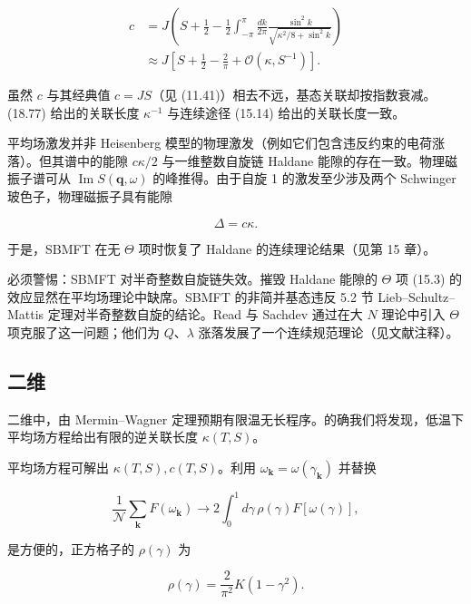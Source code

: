 \begin{align*}
c & = J \left( S + \frac {1}{2} - \frac {1}{2} \int_{- \pi} ^ {\pi} \frac {d k}{2 \pi} \frac {\sin^ {2} k}{\sqrt {\kappa^ {2} /8 + \sin^ {2} k}} \right)\\
& \approx J \left[ S + \frac {1}{2} - \frac {2}{\pi} + \mathcal {O} ( \kappa, S ^ {- 1} ) \right] .
\tag{18.78}
\end{align*}

虽然 $c$ 与其经典值 $c = JS$（见 (11.41)）相去不远，基态关联却按指数衰减。(18.77) 给出的关联长度 $\kappa^{-1}$ 与连续途径 (15.14) 给出的关联长度一致。

平均场激发并非 Heisenberg 模型的物理激发（例如它们包含违反约束的电荷涨落）。但其谱中的能隙 $c\kappa/2$ 与一维整数自旋链 Haldane 能隙的存在一致。物理磁振子谱可从 $\operatorname{Im} S(\mathbf{q},\omega)$ 的峰推得。由于自旋 1 的激发至少涉及两个 Schwinger 玻色子，物理磁振子具有能隙

\begin{equation*}
\Delta = c \kappa .
\tag{18.79}
\end{equation*}

于是，SBMFT 在无 $\Theta$ 项时恢复了 Haldane 的连续理论结果（见第 15 章）。

必须警惕：SBMFT 对半奇整数自旋链失效。摧毁 Haldane 能隙的 $\Theta$ 项 (15.3) 的效应显然在平均场理论中缺席。SBMFT 的非简并基态违反 5.2 节 Lieb--Schultz--Mattis 定理对半奇整数自旋的结论。Read 与 Sachdev 通过在大 $N$ 理论中引入 $\Theta$ 项克服了这一问题；他们为 $Q$、$\lambda$ 涨落发展了一个连续规范理论（见文献注释）。

\subsection{二维}

二维中，由 Mermin--Wagner 定理预期有限温无长程序。的确我们将发现，低温下平均场方程给出有限的逆关联长度 $\kappa(T,S)$。

平均场方程可解出 $\kappa(T, S), c(T, S)$。利用 $\omega_{\mathbf{k}} = \omega(\gamma_{\mathbf{k}})$ 并替换

\begin{equation*}
\frac {1}{\mathcal {N}} \sum_ {\mathbf {k}} F ( \omega_{\mathbf {k}} ) \rightarrow 2 \int_ {0} ^ {1} d \gamma \, \rho ( \gamma ) F [ \omega ( \gamma ) ] ,
\tag{18.80}
\end{equation*}

是方便的，正方格子的 $\rho(\gamma)$ 为

\begin{equation*}
\rho ( \gamma ) = \frac {2}{\pi^ {2}} K \left( 1 - \gamma^ {2} \right).
\tag{18.81}
\end{equation*}

